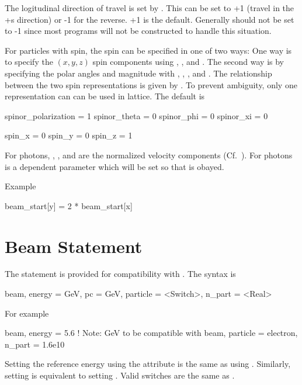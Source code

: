The logitudinal direction of travel is set by .  This can be set
to +1 (travel in the +s direction) or -1 for the reverse.  +1 is the default. Generally
 should not be set to -1 since most programs will not be
constructed to handle this situation.

For particles with spin, the spin can be specified in one of two ways:
One way is to specify the $(x, y, z)$ spin components using
, , and . The second way is by
specifying the polar angles and magnitude with ,
, , and . The
relationship between the two spin representations is given by
. To prevent ambiguity, only one representation can can be
used in lattice. The default is
\begin{example}
  spinor_polarization = 1
  spinor_theta        = 0
  spinor_phi          = 0
  spinor_xi           = 0

  spin_x              = 0
  spin_y              = 0
  spin_z              = 1
\end{example}

For photons, , , and  are the normalized velocity components
(Cf.~). For photons  is a dependent parameter which will be set
so that  is obayed.


Example
\begin{example}
  beam_start[y] = 2 * beam_start[x]
\end{example}

\section{Beam Statement}

The  statement is provided for compatibility with \mad. The syntax is
\begin{example}
  beam, energy = GeV, pc = GeV, particle = <Switch>, n_part = <Real>
\end{example}
For example
\begin{example}
  beam, energy = 5.6  ! Note: GeV to be compatible with \mad
  beam, particle = electron, n_part = 1.6e10
\end{example}
Setting the reference energy using the  attribute is the
same as using . Similarly, setting  is
equivalent to setting . Valid  switches
are the same as .

